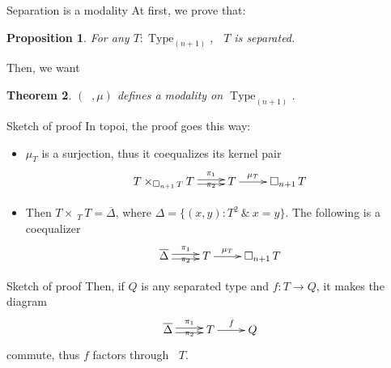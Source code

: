 \documentclass{beamer}
\makeatletter
\newtheorem{thm}{Theorem}
\newtheorem{prop}[thm]{Proposition}
\def\dar[#1]#2{\ar@<-#2>[#1]\ar@<#2>[#1]} %
\DeclareMathOperator{\Type}{Type}
\newcommand \separated {\mathop{\square_{n+1}} }
\newcommand{\nType}[1]{\Type_{#1}}
\makeatother
\begin{document}
\begin{frame}{}{Separation is a modality}
  \note{ }
  At first, we prove that:
  \begin{prop}
    For any $T:\nType {(n+1)}$, $\separated T$ is separated.  
  \end{prop}
  \pause
  \vspace{1em}
  
  Then, we want
  \begin{thm}
    $(\separated,\mu)$ defines a modality on $\nType {(n+1)}$.
  \end{thm}
\end{frame}

\begin{frame}{Sketch of proof}
  In topoi, the proof goes this way:
  \begin{itemize}[<+(1)->]
  \item $\mu_T$ is a surjection, thus it coequalizes its kernel pair
    $$\xymatrix{
      T \times_{\separated T} T \dar[r]{2pt}^-{\pi_1}_-{\pi_2}& T \ar[r]^-{\mu_T} & \separated T
    }$$
  \item Then $T \times_{\separated T} T = \overline \Delta$, where
    $\Delta = \{(x,y):T^2~\&~x=y\}$. The following is a coequalizer
    $$\xymatrix{
      \overline \Delta\dar[r]{2pt}^-{\pi_1}_-{\pi_2}& T \ar[r]^-{\mu_T} & \separated T
    }$$

  \end{itemize}
\end{frame}
\begin{frame}{Sketch of proof}
  Then, if $Q$ is any separated type and $f:T\to Q$, it makes the diagram
  $$\xymatrix{
    \overline \Delta\dar[r]{2pt}^-{\pi_1}_-{\pi_2}& T \ar[r]^f & Q}$$
  commute, thus $f$ factors through $\separated T$.
\end{frame}
\end{document}
